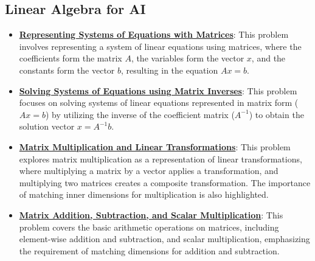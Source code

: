 \documentclass{article}%
\begin{document}
%
\subsection{Linear Algebra for AI}%
\label{subsec:LinearAlgebraforAI}%
\begin{itemize}[leftmargin=*]%
\item \href{https://purdue.brightspace.com/d2l/common/assets/pdfjs-d2l-dist/1.0.14-legacy/web/viewer.html?file=\%2Fcontent\%2Fenforced\%2F1095467-wl.202510.CS.24300.001\%2F04L1-Linear Algebra Primer.pdf\%3Fou\%3D1095467\&lang=en-us\&container=d2l-fileviewer-rendered-pdf\&fullscreen=d2l-fileviewer-rendered-pdf-dialog\&height=667#page=11}{\textbf{Representing Systems of Equations with Matrices}}: This problem involves representing a system of linear equations using matrices, where the coefficients form the matrix $A$, the variables form the vector $x$, and the constants form the vector $b$, resulting in the equation $Ax = b$.%
\item \href{https://purdue.brightspace.com/d2l/common/assets/pdfjs-d2l-dist/1.0.14-legacy/web/viewer.html?file=\%2Fcontent\%2Fenforced\%2F1095467-wl.202510.CS.24300.001\%2F04L1-Linear Algebra Primer.pdf\%3Fou\%3D1095467\&lang=en-us\&container=d2l-fileviewer-rendered-pdf\&fullscreen=d2l-fileviewer-rendered-pdf-dialog\&height=667#page=12}{\textbf{Solving Systems of Equations using Matrix Inverses}}: This problem focuses on solving systems of linear equations represented in matrix form ($Ax = b$) by utilizing the inverse of the coefficient matrix ($A^{-1}$) to obtain the solution vector $x = A^{-1}b$.%
\item \href{https://purdue.brightspace.com/d2l/common/assets/pdfjs-d2l-dist/1.0.14-legacy/web/viewer.html?file=\%2Fcontent\%2Fenforced\%2F1095467-wl.202510.CS.24300.001\%2F04L1-Linear Algebra Primer.pdf\%3Fou\%3D1095467\&lang=en-us\&container=d2l-fileviewer-rendered-pdf\&fullscreen=d2l-fileviewer-rendered-pdf-dialog\&height=667#page=14}{\textbf{Matrix Multiplication and Linear Transformations}}: This problem explores matrix multiplication as a representation of linear transformations, where multiplying a matrix by a vector applies a transformation, and multiplying two matrices creates a composite transformation. The importance of matching inner dimensions for multiplication is also highlighted.%
\item \href{https://purdue.brightspace.com/d2l/common/assets/pdfjs-d2l-dist/1.0.14-legacy/web/viewer.html?file=\%2Fcontent\%2Fenforced\%2F1095467-wl.202510.CS.24300.001\%2F04L1-Linear Algebra Primer.pdf\%3Fou\%3D1095467\&lang=en-us\&container=d2l-fileviewer-rendered-pdf\&fullscreen=d2l-fileviewer-rendered-pdf-dialog\&height=667#page=9}{\textbf{Matrix Addition, Subtraction, and Scalar Multiplication}}: This problem covers the basic arithmetic operations on matrices, including element{-}wise addition and subtraction, and scalar multiplication, emphasizing the requirement of matching dimensions for addition and subtraction.%

\end{itemize}
\end{document}
